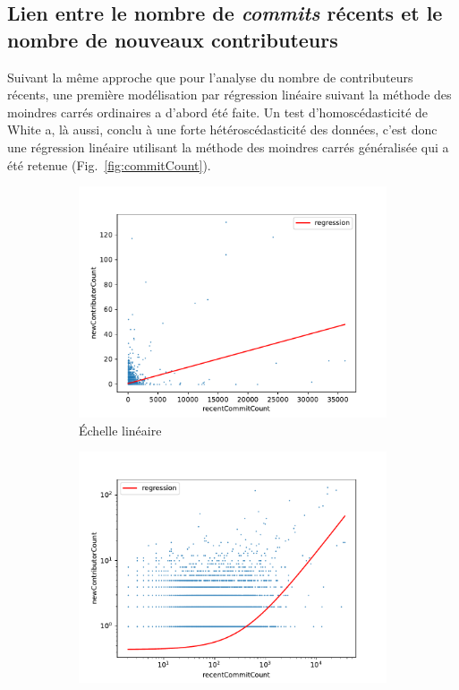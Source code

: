 \documentclass[dvipsnames,runningheads]{llncs}
\newcommand{\en}[1]{\foreignlanguage{english}{\emph{#1}}}
\begin{document}
    \subsection{Lien entre le nombre de \en{commits} récents et le nombre de nouveaux contributeurs}

    Suivant la même approche que pour l'analyse du nombre de contributeurs récents, une première modélisation
    par régression linéaire suivant la méthode des moindres carrés ordinaires a d'abord été faite. Un test
    d'homoscédasticité de White a, là aussi, conclu à une forte hétéroscédasticité des données, c'est donc une
    régression linéaire utilisant la méthode des moindres carrés généralisée qui a été retenue
    (Fig.~\ref{fig:commitCount}).

    \begin{figure}[ht]
        \centering
        \begin{subfigure}[t]{0.5\textwidth}
            \includegraphics[width=\textwidth]{../experiment/data_analysis/recentCommitCountRegression_linearScale}
            \caption{Échelle linéaire}
        \end{subfigure}%
        \begin{subfigure}[t]{0.5\textwidth}
            \includegraphics[width=\textwidth]{../experiment/data_analysis/recentCommitCountRegression_logScale}

\end{subfigure}
\end{figure}
\end{document}
